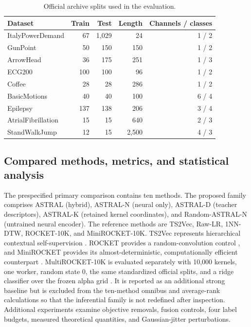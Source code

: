 \documentclass[pdflatex,sn-mathphys-num]{sn-jnl}
\newcommand{\1}{\mathbf{1}}
\theoremstyle{plain}
\begin{document}
	\begin{table}[htbp]
		\centering
		\caption{Official archive splits used in the evaluation.}
		\label{tab:datasets}
		\small
		\begin{tabular}{lrrrr}
			\toprule
			Dataset & Train & Test & Length & Channels / classes \\
			\midrule
			ItalyPowerDemand & 67 & 1,029 & 24 & 1 / 2 \\
			GunPoint & 50 & 150 & 150 & 1 / 2 \\
			ArrowHead & 36 & 175 & 251 & 1 / 3 \\
			ECG200 & 100 & 100 & 96 & 1 / 2 \\
			Coffee & 28 & 28 & 286 & 1 / 2 \\
			BasicMotions & 40 & 40 & 100 & 6 / 4 \\
			Epilepsy & 137 & 138 & 206 & 3 / 4 \\
			AtrialFibrillation & 15 & 15 & 640 & 2 / 3 \\
			StandWalkJump & 12 & 15 & 2,500 & 4 / 3 \\
			\bottomrule
		\end{tabular}
	\end{table}
	
	\subsection{Compared methods, metrics, and statistical analysis}
	
	The prespecified primary comparison contains ten methods. The proposed family comprises ASTRAL (hybrid), ASTRAL-N (neural only), ASTRAL-D (teacher descriptors), ASTRAL-K (retained kernel coordinates), and Random-ASTRAL-N (untrained neural encoder). The reference methods are TS2Vec, Raw-LR, 1NN-DTW, ROCKET-10K, and MiniROCKET-10K. TS2Vec represents hierarchical contextual self-supervision \cite{yue2022ts2vec}. ROCKET provides a random-convolution control \cite{dempster2020rocket}, and MiniROCKET provides its almost-deterministic, computationally efficient counterpart \cite{dempster2021minirocket}. MultiROCKET-10K is evaluated separately with 10,000 kernels, one worker, random state 0, the same standardized official splits, and a ridge classifier over the frozen alpha grid \cite{tan2022multirocket}. It is reported as an additional strong baseline but is excluded from the ten-method omnibus and average-rank calculations so that the inferential family is not redefined after inspection. Additional experiments examine objective removals, fusion controls, four label budgets, measured theoretical quantities, and Gaussian-jitter perturbations.
	
\end{document}
